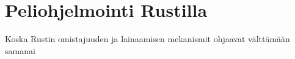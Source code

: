 \documentclass[finnish]{tktltiki2}
\theoremstyle{definition}
\theoremstyle{remark}
\begin{document}
\section{Peliohjelmointi Rustilla}

Koska Rustin omistajuuden ja lainaamisen mekanismit ohjaavat välttämään samanai



% 

%
%
% 
%







% 
\end{document}
